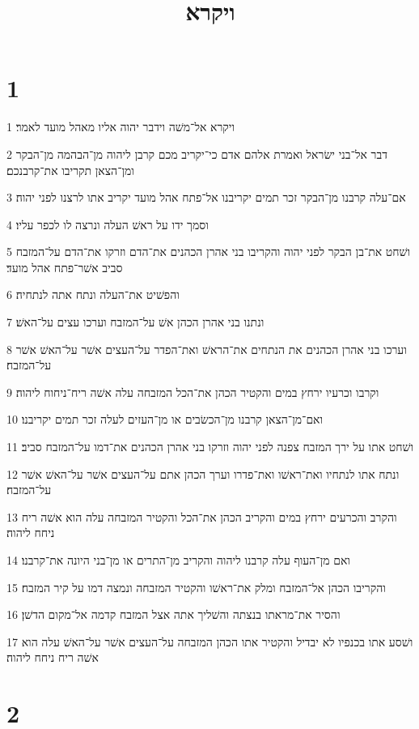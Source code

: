 

\title{ויקרא}


\chapter{1}

\par 1 ויקרא אל־משׁה וידבר יהוה אליו מאהל מועד לאמר׃
\par 2 דבר אל־בני ישׂראל ואמרת אלהם אדם כי־יקריב מכם קרבן ליהוה מן־הבהמה מן־הבקר ומן־הצאן תקריבו את־קרבנכם׃
\par 3 אם־עלה קרבנו מן־הבקר זכר תמים יקריבנו אל־פתח אהל מועד יקריב אתו לרצנו לפני יהוה׃
\par 4 וסמך ידו על ראשׁ העלה ונרצה לו לכפר עליו׃
\par 5 ושׁחט את־בן הבקר לפני יהוה והקריבו בני אהרן הכהנים את־הדם וזרקו את־הדם על־המזבח סביב אשׁר־פתח אהל מועד׃
\par 6 והפשׁיט את־העלה ונתח אתה לנתחיה׃
\par 7 ונתנו בני אהרן הכהן אשׁ על־המזבח וערכו עצים על־האשׁ׃
\par 8 וערכו בני אהרן הכהנים את הנתחים את־הראשׁ ואת־הפדר על־העצים אשׁר על־האשׁ אשׁר על־המזבח׃
\par 9 וקרבו וכרעיו ירחץ במים והקטיר הכהן את־הכל המזבחה עלה אשׁה ריח־ניחוח ליהוה׃
\par 10 ואם־מן־הצאן קרבנו מן־הכשׂבים או מן־העזים לעלה זכר תמים יקריבנו׃
\par 11 ושׁחט אתו על ירך המזבח צפנה לפני יהוה וזרקו בני אהרן הכהנים את־דמו על־המזבח סביב׃
\par 12 ונתח אתו לנתחיו ואת־ראשׁו ואת־פדרו וערך הכהן אתם על־העצים אשׁר על־האשׁ אשׁר על־המזבח׃
\par 13 והקרב והכרעים ירחץ במים והקריב הכהן את־הכל והקטיר המזבחה עלה הוא אשׁה ריח ניחח ליהוה׃
\par 14 ואם מן־העוף עלה קרבנו ליהוה והקריב מן־התרים או מן־בני היונה את־קרבנו׃
\par 15 והקריבו הכהן אל־המזבח ומלק את־ראשׁו והקטיר המזבחה ונמצה דמו על קיר המזבח׃
\par 16 והסיר את־מראתו בנצתה והשׁליך אתה אצל המזבח קדמה אל־מקום הדשׁן׃
\par 17 ושׁסע אתו בכנפיו לא יבדיל והקטיר אתו הכהן המזבחה על־העצים אשׁר על־האשׁ עלה הוא אשׁה ריח ניחח ליהוה׃

\chapter{2}

